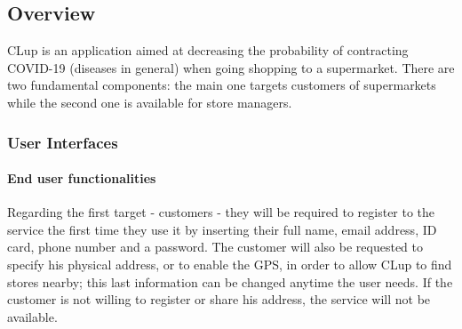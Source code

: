 \subsection{Overview}
CLup is an application aimed at decreasing the probability of contracting COVID-19 (diseases in general) when going shopping to a supermarket. There are two fundamental components: the main one targets customers of supermarkets while the second one is available for store managers.\newline
\subsubsection{User Interfaces}
\paragraph{End user functionalities}
Regarding the first target - customers - they will be required to register to the service the first time they use it by inserting their full name, email address, ID card, phone number and a password. The customer will also be requested to specify his physical address, or to enable the GPS, in order to allow CLup to find stores nearby; this last information can be changed anytime the user needs. If the customer is not willing to register or share his address, the service will not be available.
